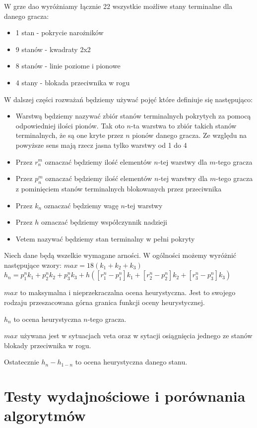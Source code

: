 \documentclass{scrartcl}
\begin{document}
W grze dao wyróżniamy łącznie 22 wszystkie możliwe stany terminalne dla danego gracza:
\begin{itemize}
\item 1 stan - pokrycie narożników
\item 9 stanów - kwadraty 2x2
\item 8 stanów - linie poziome i pionowe
\item 4 stany - blokada przeciwnika w rogu
\end{itemize}
W dalszej części rozważań będziemy używać pojęć które definiuje się następująco:
\begin{itemize}
\item Warstwą będziemy nazywać zbiór stanów terminalnych pokrytych za pomocą odpowiedniej ilości pionów. Tak oto $n$-ta warstwa to zbiór takich stanów terminalnych, że są one kryte przez $n$ pionów danego gracza. Ze względu na powyższe sens mają rzecz jasna tylko warstwy od 1 do 4
\item Przez $r_{n}^{m}$ oznaczać będziemy ilość elementów $n$-tej warstwy dla $m$-tego gracza
\item Przez $p_{n}^{m}$ oznaczać będziemy ilość elementów $n$-tej warstwy dla $m$-tego gracza z pominięciem stanów terminalnych blokowanych przez przeciwnika
\item Przez $k_{n}$ oznaczać będziemy wagę $n$-tej warstwy
\item Przez $h$ oznaczać będziemy współczynnik nadzieji
\item Vetem nazywać będziemy stan terminalny w pełni pokryty
\end{itemize}
Niech dane będą wszelkie wymagane arności. W ogólności możemy wyróżnić następujące wzory:
$max = 18 ( k_{1} + k_{2} + k_{3} )$
$h_{n} = p_{1}^{n} k_{1} + p_{2}^{n} k_{2} + p_{3}^{n} k_{3} + h ([r_{1}^{n} - p_{1}^{n}] k_{1} + [r_{2}^{n} - p_{2}^{n}] k_{2} + [r_{3}^{n} - p_{3}^{n}] k_{3})$

$max$ to maksymalna i nieprzekraczalna ocena heurystyczna. Jest to swojego rodzaju przeszacowana górna granica funkcji oceny heurystycznej.

$h_{n}$ to ocena heurystyczna $n$-tego gracza.

$max$ używana jest w sytuacjach veta oraz w sytacji osiągnięcia jednego ze stanów blokady przeciwnika w rogu.

Ostatecznie $h_{n} - h_{1-n}$ to ocena heurystyczna danego stanu.

\section{Testy wydajnościowe i porównania algorytmów}
\end{document}
